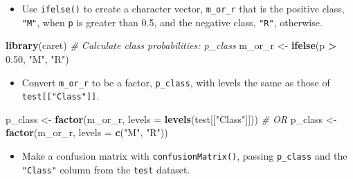 \documentclass[
]{book}
\newenvironment{Shaded}{\begin{snugshade}}{\end{snugshade}}
\newcommand{\CommentTok}[1]{\textcolor[rgb]{0.56,0.35,0.01}{\textit{#1}}}
\newcommand{\DataTypeTok}[1]{\textcolor[rgb]{0.13,0.29,0.53}{#1}}
\newcommand{\FloatTok}[1]{\textcolor[rgb]{0.00,0.00,0.81}{#1}}
\newcommand{\KeywordTok}[1]{\textcolor[rgb]{0.13,0.29,0.53}{\textbf{#1}}}
\newcommand{\NormalTok}[1]{#1}
\newcommand{\OperatorTok}[1]{\textcolor[rgb]{0.81,0.36,0.00}{\textbf{#1}}}
\newcommand{\StringTok}[1]{\textcolor[rgb]{0.31,0.60,0.02}{#1}}
\providecommand{\tightlist}{%
  \setlength{\itemsep}{0pt}\setlength{\parskip}{0pt}}
\begin{document}
\begin{itemize}
\tightlist
\item
  Use \texttt{ifelse()} to create a character vector, \texttt{m\_or\_r} that is the positive class, \texttt{"M"}, when \texttt{p} is greater than 0.5, and the negative class, \texttt{"R"}, otherwise.
\end{itemize}

\begin{Shaded}
\begin{Highlighting}[]
\KeywordTok{library}\NormalTok{(caret)}
\CommentTok{# Calculate class probabilities: p_class}
\NormalTok{m_or_r <-}\StringTok{ }\KeywordTok{ifelse}\NormalTok{(p }\OperatorTok{>}\StringTok{ }\FloatTok{0.50}\NormalTok{, }\StringTok{"M"}\NormalTok{, }\StringTok{"R"}\NormalTok{)}
\end{Highlighting}
\end{Shaded}

\begin{itemize}
\tightlist
\item
  Convert \texttt{m\_or\_r} to be a factor, \texttt{p\_class}, with levels the same as those of \texttt{test{[}{[}"Class"{]}{]}}.
\end{itemize}

\begin{Shaded}
\begin{Highlighting}[]
\NormalTok{p_class <-}\StringTok{ }\KeywordTok{factor}\NormalTok{(m_or_r, }\DataTypeTok{levels =} \KeywordTok{levels}\NormalTok{(test[[}\StringTok{"Class"}\NormalTok{]]))}
\CommentTok{# OR}
\NormalTok{p_class <-}\StringTok{ }\KeywordTok{factor}\NormalTok{(m_or_r, }\DataTypeTok{levels =} \KeywordTok{c}\NormalTok{(}\StringTok{"M"}\NormalTok{, }\StringTok{"R"}\NormalTok{))}
\end{Highlighting}
\end{Shaded}

\begin{itemize}
\tightlist
\item
  Make a confusion matrix with \texttt{confusionMatrix()}, passing \texttt{p\_class} and the \texttt{"Class"} column from the \texttt{test} dataset.
\end{itemize}

\begin{Shaded}
\end{Shaded}
\end{document}
